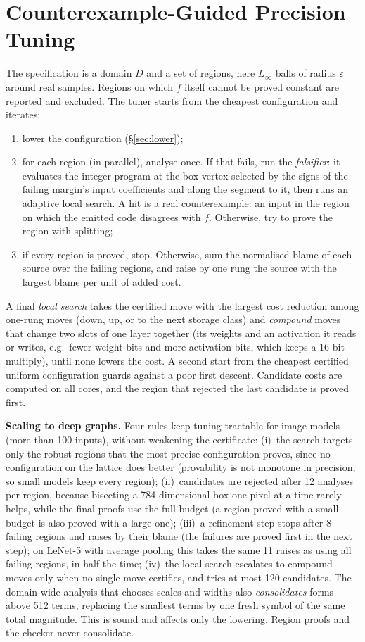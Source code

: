 \section{Counterexample-Guided Precision Tuning}\label{sec:cegar}
The specification is a domain $D$ and a set of regions, here $L_\infty$ balls of radius $\varepsilon$ around real samples. Regions on which $f$ itself cannot be proved constant are reported and excluded. The tuner starts from the cheapest configuration and iterates:
\begin{enumerate}
\item lower the configuration (\S\ref{sec:lower});
\item for each region (in parallel), analyse once. If that fails, run the \emph{falsifier}: it evaluates the integer program at the box vertex selected by the signs of the failing margin's input coefficients and along the segment to it, then runs an adaptive local search. A hit is a real counterexample: an input in the region on which the emitted code disagrees with $f$. Otherwise, try to prove the region with splitting;
\item if every region is proved, stop. Otherwise, sum the normalised blame of each source over the failing regions, and raise by one rung the source with the largest blame per unit of added cost.
\end{enumerate}
A final \emph{local search} takes the certified move with the largest cost reduction among one-rung moves (down, up, or to the next storage class) and \emph{compound} moves that change two slots of one layer together (its weights and an activation it reads or writes, e.g.\ fewer weight bits and more activation bits, which keeps a 16-bit multiply), until none lowers the cost. A second start from the cheapest certified uniform configuration guards against a poor first descent. Candidate costs are computed on all cores, and the region that rejected the last candidate is proved first.

\textbf{Scaling to deep graphs.} Four rules keep tuning tractable for image models (more than 100 inputs), without weakening the certificate:
(i)~the search targets only the robust regions that the most precise configuration proves, since no configuration on the lattice does better (provability is not monotone in precision, so small models keep every region);
(ii)~candidates are rejected after 12 analyses per region, because bisecting a 784-dimensional box one pixel at a time rarely helps, while the final proofs use the full budget (a region proved with a small budget is also proved with a large one);
(iii)~a refinement step stops after 8 failing regions and raises by their blame (the failures are proved first in the next step); on LeNet-5 with average pooling this takes the same 11 raises as using all failing regions, in half the time;
(iv)~the local search escalates to compound moves only when no single move certifies, and tries at most 120 candidates.
The domain-wide analysis that chooses scales and widths also \emph{consolidates} forms above 512 terms, replacing the smallest terms by one fresh symbol of the same total magnitude. This is sound and affects only the lowering. Region proofs and the checker never consolidate.

